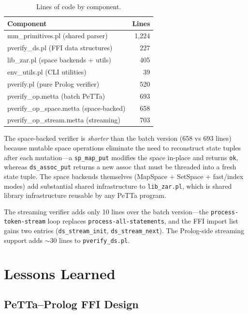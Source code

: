 \documentclass[11pt]{article}
\begin{document}
\begin{table}[ht]
\centering
\caption{Lines of code by component.}
\label{tab:loc}
\begin{tabular}{lr}
\toprule
\textbf{Component} & \textbf{Lines} \\
\midrule
mm\_primitives.pl (shared parser)       & 1{,}224 \\
pverify\_ds.pl (FFI data structures)    & 227 \\
lib\_zar.pl (space backends + utils)    & 405 \\
env\_utils.pl (CLI utilities)           & 39 \\
\midrule
pverify.pl (pure Prolog verifier)       & 520 \\
pverify\_op.metta (batch PeTTa)         & 693 \\
pverify\_op\_space.metta (space-backed) & 658 \\
pverify\_op\_stream.metta (streaming)   & 703 \\
\bottomrule
\end{tabular}
\end{table}

The space-backed verifier is \emph{shorter} than the batch version
(658 vs 693 lines) because mutable space operations eliminate the
need to reconstruct state tuples after each mutation---a
\texttt{sp\_map\_put} modifies the space in-place and returns
\texttt{ok}, whereas \texttt{ds\_assoc\_put} returns a new assoc
that must be threaded into a fresh state tuple.  The space backends
themselves (MapSpace + SetSpace + fast/index modes) add substantial
shared infrastructure to
\texttt{lib\_zar.pl},
which is shared library infrastructure reusable by any PeTTa program.

The streaming verifier adds only 10 lines over the batch version---the
\texttt{process-token-stream} loop replaces
\texttt{process-all-statements}, and the FFI import list gains two
entries (\texttt{ds\_stream\_init}, \texttt{ds\_stream\_next}).
The Prolog-side streaming support adds $\sim$30 lines to
\texttt{pverify\_ds.pl}.

\section{Lessons Learned}
\label{sec:lessons}

\subsection{PeTTa--Prolog FFI Design}
\end{document}
